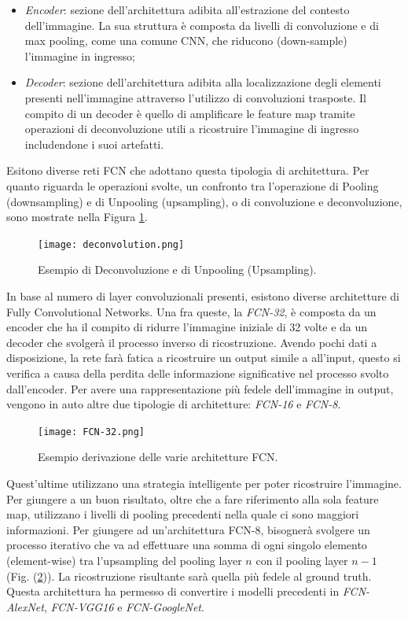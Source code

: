 \begin{itemize}
    \item \emph{Encoder}: sezione dell’architettura adibita all’estrazione del contesto dell’immagine. 
    La sua struttura è composta da livelli di convoluzione e di max 
    pooling, come una comune CNN, che riducono (down-sample) l’immagine 
    in ingresso; 
    \item \emph{Decoder}: sezione dell’architettura adibita alla localizzazione degli elementi 
    presenti nell’immagine attraverso l’utilizzo di convoluzioni trasposte. Il compito 
    di un decoder è quello di amplificare le feature map tramite operazioni 
    di deconvoluzione utili a ricostruire l’immagine di ingresso includendone i 
    suoi artefatti.
\end{itemize}
Esitono diverse reti FCN che adottano questa tipologia di architettura. Per 
quanto riguarda le operazioni svolte, un confronto tra l’operazione di Pooling 
(downsampling) e di Unpooling (upsampling), o di convoluzione e deconvoluzione, 
sono mostrate nella Figura \ref{deconvolution}.
\begin{figure}
    \centering
    \texttt{[image: deconvolution.png]}
    \centering
    \caption{Esempio di Deconvoluzione e di Unpooling (Upsampling).}
    \label{deconvolution}
\end{figure}
In base al numero di layer convoluzionali presenti, esistono diverse architetture 
di Fully Convolutional Networks. Una fra queste, la \emph{FCN-32}, è composta da 
un encoder che ha il compito di ridurre l’immagine iniziale di 32 volte e da un 
decoder che svolgerà il processo inverso di ricostruzione. Avendo pochi dati a 
disposizione, la rete farà fatica a ricostruire un output simile a all’input, questo si 
verifica a causa della perdita delle informazione significative nel processo svolto 
dall’encoder. Per avere una rappresentazione più fedele dell’immagine in output, 
vengono in auto altre due tipologie di architetture: \emph{FCN-16} e \emph{FCN-8}.
\begin{figure}
    \centering
    \texttt{[image: FCN-32.png]}
    \centering
    \caption{Esempio derivazione delle varie architetture FCN.}
    \label{FCN-models}
\end{figure}
Quest’ultime utilizzano una strategia intelligente per poter ricostruire l’immagine. 
Per giungere a un buon risultato, oltre che a fare riferimento alla sola feature 
map, utilizzano i livelli di pooling precedenti nella quale ci sono maggiori informazioni. 
Per giungere ad un’architettura FCN-8, bisognerà svolgere un processo 
iterativo che va ad effettuare una somma di ogni singolo elemento (element-wise) 
tra l’upsampling del pooling layer $n$ con il pooling layer $n-1$ (Fig. (\ref{FCN-models})). La ricostruzione 
risultante sarà quella più fedele al ground truth. Questa architettura 
ha permesso di convertire i modelli precedenti in \emph{FCN-AlexNet}, \emph{FCN-VGG16} e 
\emph{FCN-GoogleNet}.

